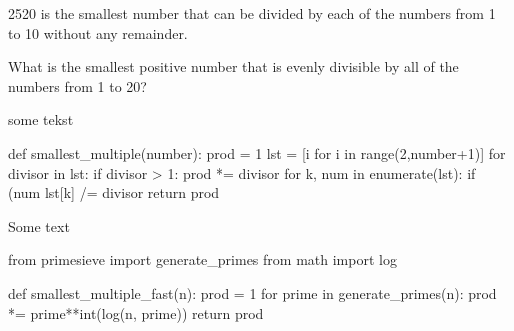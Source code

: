 
\begin{ProjectEuler}{5}
2520 is the smallest number that can be divided by each of the numbers from 1 to 10 without any remainder.

What is the smallest positive number that is evenly divisible by all of the numbers from 1 to 20?
\end{ProjectEuler}

some tekst 
\begin{pythoncode}
	def smallest_multiple(number):
	    prod = 1
	    lst = [i for i in range(2,number+1)]
	    for divisor in lst:
	        if divisor > 1:
	            prod *= divisor
	            for k, num in enumerate(lst):
	                if (num %
	                    lst[k] /= divisor
	    return prod
\end{pythoncode}

Some text

\begin{pythoncode}
    from primesieve import generate_primes
    from math import log

    def smallest_multiple_fast(n):
        prod = 1
        for prime in generate_primes(n):
            prod *= prime**int(log(n, prime))
        return prod
\end{pythoncode}

